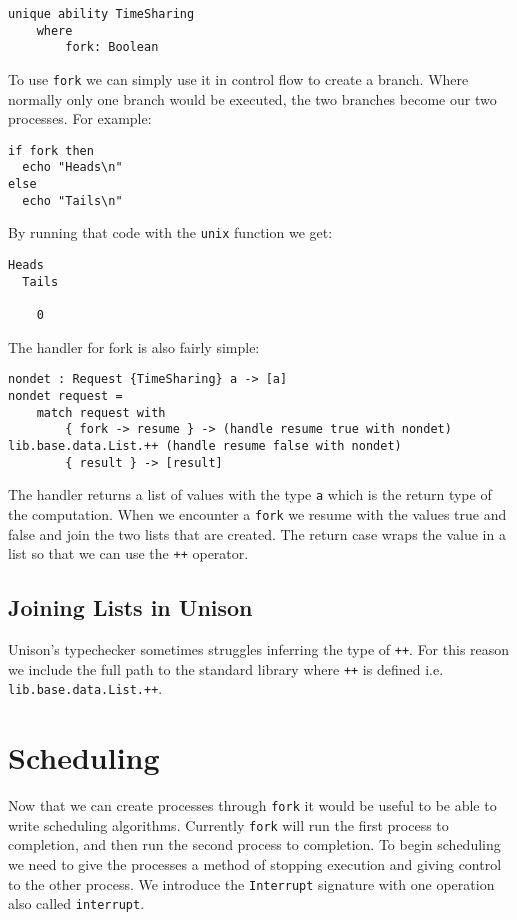 \documentclass[logo,bsc,singlespacing,parskip]{infthesis}
\begin{document}
\begin{lstlisting}[language=unison]
unique ability TimeSharing
    where
        fork: Boolean
\end{lstlisting}

To use \texttt{fork} we can simply use it in control flow to create a branch.
Where normally only one branch would be executed, the two branches become our
two processes. For example:

\begin{lstlisting}[language=unison]
if fork then 
  echo "Heads\n"
else 
  echo "Tails\n"
\end{lstlisting}

By running that code with the \texttt{unix} function we get:

\begin{lstlisting}[style=terminal]
  Heads
  Tails
    
    0
\end{lstlisting}

The handler for fork is also fairly simple:

\begin{lstlisting}[language=unison]
nondet : Request {TimeSharing} a -> [a]
nondet request =
    match request with
        { fork -> resume } -> (handle resume true with nondet) lib.base.data.List.++ (handle resume false with nondet)
        { result } -> [result]
\end{lstlisting}

The handler returns a list of values with the type \texttt{a} which is the
return type of the computation. When we encounter a \texttt{fork} we resume
with the values true and false and join the two lists that are created. The
return case wraps the value in a list so that we can use the \texttt{++}
operator.

\subsection{Joining Lists in Unison}

Unison's typechecker sometimes struggles inferring the type of \texttt{++}. For
this reason we include the full path to the standard library where \texttt{++}
is defined i.e. \texttt{lib.base.data.List.++}.

\section{Scheduling}

Now that we can create processes through \texttt{fork} it would be useful to be able to write scheduling algorithms. Currently \texttt{fork} will run the first process to completion, and then run the second process to completion. To begin scheduling we need to give the processes a method of stopping execution and giving control to the other process. We introduce the \texttt{Interrupt} signature with one operation also called \texttt{interrupt}.
\end{document}
